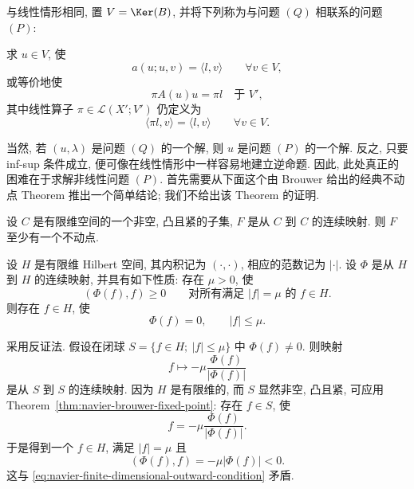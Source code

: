 与线性情形相同, 置 $V=\Ker(B)$, 并将下列称为与问题 $(Q)$ 相联系的问题 $(P)$:

求 $u\in V$, 使
\begin{equation}\label{eq:navier-abstract-p}
a(u;u,v)=\langle l,v\rangle
\qquad\forall v\in V,
\end{equation}
或等价地使
\begin{equation}\label{eq:navier-abstract-p-operator}
\pi A(u)u=\pi l\quad\text{于 }V',
\end{equation}
其中线性算子 $\pi\in\mathcal L(X';V')$ 仍定义为
\[
\langle\pi l,v\rangle=\langle l,v\rangle
\qquad\forall v\in V.
\]

当然, 若 $(u,\lambda)$ 是问题 $(Q)$ 的一个解, 则 $u$ 是问题 $(P)$ 的一个解.
反之, 只要 inf-sup 条件成立, 便可像在线性情形中一样容易地建立逆命题.
因此, 此处真正的困难在于求解非线性问题 $(P)$.
首先需要从下面这个由 Brouwer 给出的经典不动点 Theorem 推出一个简单结论;
我们不给出该 Theorem 的证明.

\begin{Theorem}\label{thm:navier-brouwer-fixed-point}
设 $C$ 是有限维空间的一个非空, 凸且紧的子集,
$F$ 是从 $C$ 到 $C$ 的连续映射. 则 $F$ 至少有一个不动点.
\end{Theorem}

\setcounter{statement}{0}
\begin{Corollary}\label{cor:navier-finite-dimensional-zero}
设 $H$ 是有限维 Hilbert 空间, 其内积记为 $(\cdot,\cdot)$,
相应的范数记为 $|\cdot|$. 设 $\Phi$ 是从 $H$ 到 $H$ 的连续映射,
并具有如下性质: 存在 $\mu>0$, 使
\begin{equation}\label{eq:navier-finite-dimensional-outward-condition}
(\Phi(f),f)\geq0
\qquad\text{对所有满足 }|f|=\mu\text{ 的 }f\in H.
\end{equation}
则存在 $f\in H$, 使
\begin{equation}\label{eq:navier-finite-dimensional-zero}
\Phi(f)=0,\qquad |f|\leq\mu.
\end{equation}
\end{Corollary}

\begin{Proof}
采用反证法. 假设在闭球
$S=\{f\in H;\ |f|\leq\mu\}$ 中 $\Phi(f)\ne0$.
则映射
\[
f\longmapsto-\mu\frac{\Phi(f)}{|\Phi(f)|}
\]
是从 $S$ 到 $S$ 的连续映射. 因为 $H$ 是有限维的,
而 $S$ 显然非空, 凸且紧, 可应用
Theorem~\ref{thm:navier-brouwer-fixed-point}:
存在 $f\in S$, 使
\[
f=-\mu\frac{\Phi(f)}{|\Phi(f)|}.
\]
于是得到一个 $f\in H$, 满足 $|f|=\mu$ 且
\[
(\Phi(f),f)=-\mu|\Phi(f)|<0.
\]
这与 \eqref{eq:navier-finite-dimensional-outward-condition} 矛盾.
\end{Proof}

